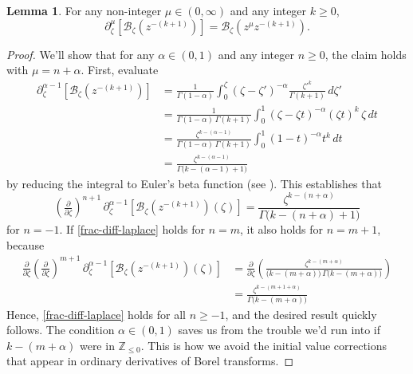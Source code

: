 \documentclass{article}
\theoremstyle{definition}
\newcommand{\Z}{\mathbb{Z}}
\newcommand{\borel}{\mathcal{B}}
\newtheorem{lemma}[definition]{Lemma}
\begin{document}
\begin{lemma}\label{lem:frac-deriv-Borel}
For any non-integer $\mu \in (0, \infty)$ and any integer $k \ge 0$,
\[ \partial^\mu_{\zeta } \left[ \borel_\zeta \left(z^{-(k+1)}\right) \right] =  \borel_\zeta \left(z^\mu z^{-(k+1)}\right). \]
\end{lemma}
\begin{proof}
We'll show that for any $\alpha \in (0, 1)$ and any integer $n \ge 0$, the claim holds with $\mu = n + \alpha$. First, evaluate
\begin{align*}
\partial^{\alpha-1}_{\zeta} \left[ \borel_\zeta \left(z^{-(k+1)}\right) \right] & = \frac{1}{\Gamma(1-\alpha)} \int_0^\zeta (\zeta-\zeta')^{-\alpha} \frac{{\zeta'}^k}{\Gamma(k+1)}\,d\zeta' \\
& = \frac{1}{\Gamma(1-\alpha)\,\Gamma(k+1)} \int_0^1 (\zeta-\zeta t)^{-\alpha} (\zeta t)^k\,\zeta\,dt \\
& = \frac{\zeta^{k-(\alpha-1)}}{\Gamma(1-\alpha)\,\Gamma(k+1)} \int_0^1 (1-t)^{-\alpha} t^k\,dt \\
& = \frac{\zeta^{k-(\alpha-1)}}{\Gamma\big(k-(\alpha-1)+1\big)}
\end{align*}
by reducing the integral to Euler's beta function (see \cite[Identity 5.12.1]{dlmf}). This establishes that
\begin{equation}\label{frac-diff-laplace}
\left(\tfrac{\partial}{\partial \zeta}\right)^{n+1}\,\partial^{\alpha-1}_{\zeta } \left[ \borel_\zeta \left(z^{-(k+1)}\right)(\zeta) \right] = \frac{\zeta^{k-(n+\alpha)}}{\Gamma\big(k-(n+\alpha)+1\big)}
\end{equation}
for $n = -1$. If \eqref{frac-diff-laplace} holds for $n = m$, it also holds for $n = m+1$, because
\begin{align*}
\tfrac{\partial}{\partial \zeta} \left(\tfrac{\partial}{\partial \zeta}\right)^{m+1}\,\partial^{\alpha-1}_{\zeta} \left[ \borel_\zeta \left(z^{-(k+1)}\right)(\zeta) \right] & = \tfrac{\partial}{\partial \zeta} \left( \frac{\zeta^{k-(m+\alpha)}}{\big(k-(m+\alpha)\big)\,\Gamma\big(k-(m+\alpha)\big)} \right) \\
& = \frac{\zeta^{k-(m+1+\alpha)}}{\Gamma\big(k-(m+\alpha)\big)}
\end{align*}
Hence, \eqref{frac-diff-laplace} holds for all $n \ge -1$, and the desired result quickly follows. The condition $\alpha \in (0, 1)$ saves us from the trouble we'd run into if $k-(m+\alpha)$ were in $\Z_{\le 0}$. This is how we avoid the initial value corrections that appear in ordinary derivatives of Borel transforms.
\end{proof}
\end{document}

